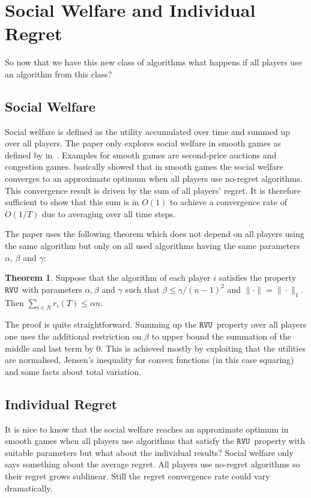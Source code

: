 \documentclass[a4paper]{article}
\theoremstyle{definition}
\newtheorem{theorem}{Theorem}
\newcommand{\myprop}{\ensuremath{\texttt{RVU}}}
\begin{document}
\section{Social Welfare and Individual Regret}
So now that we have this new class of algorithms what happens if all
players use an algorithm from this class?

\subsection{Social Welfare}
Social welfare is defined as the utility accumulated over time and summed up over all players.
The paper only explores social welfare in smooth games as defined by
\citeauthor{Roughgarden:2009:IRP:1536414.1536485} in~\cite{Roughgarden:2009:IRP:1536414.1536485}.
Examples for smooth games are second-price auctions and congestion
games.
\citeauthor{Roughgarden:2009:IRP:1536414.1536485} basically showed
that in smooth games the social welfare converges to an approximate
optimum when all players use no-regret algorithms.
This convergence result is driven by the sum of all players' regret.
It is therefore sufficient to show that this sum is in $O(1)$
to achieve a convergence rate of $O(1/T)$ due to averaging over all
time steps.

The paper uses the following theorem which does not depend on all
players using the same algorithm but only on all used algorithms having the
same parameters $\alpha$, $\beta$ and $\gamma$:

\begin{theorem}\label{thm:sufficient}
Suppose that the algorithm of each player $i$ satisfies the property
\myprop~with parameters $\alpha, \beta$ and $\gamma$ such that
$\beta\leq \gamma/(n-1)^2$ and $\|\cdot\| = \|\cdot\|_1$. Then
$\sum_{i\in N} r_i(T) \leq \alpha n$.
\end{theorem}


The proof is quite straightforward.
Summing up the \myprop~property over all players one uses the
additional restriction on $\beta$ to upper bound the summation of the
middle and last term by 0. This is achieved mostly by exploiting that
the utilities are normalised, Jensen's
inequality for convex functions (in this case squaring) and some facts
about total variation.


\subsection{Individual Regret}
It is nice to know that the social welfare reaches an approximate
optimum in smooth games when all players use algorithms that satisfy
the \myprop~property with suitable parameters but what about the
individual results?
Social welfare only says something about the average regret.
All players use no-regret algorithms so their regret grows sublinear.
Still the regret convergence rate could vary dramatically.
\end{document}
